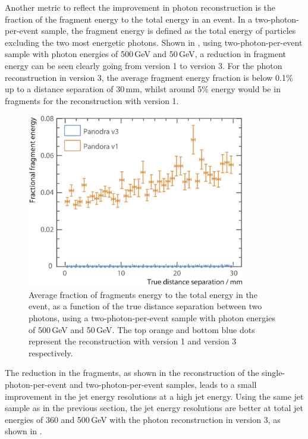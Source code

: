 Another metric to reflect the improvement in photon reconstruction is the fraction of the fragment energy to the total energy in an event. In a two-photon-per-event sample, the fragment energy is defined as the total energy of particles excluding the two most energetic photons. Shown in , using two-photon-per-event sample with photon energies of  500\,GeV and 50\,GeV, a reduction in fragment energy can be seen clearly going from \pandora version 1 to version 3. For the photon reconstruction in \pandora version 3, the average fragment energy fraction is below 0.1\% up to a distance separation of  30\,mm, whilst around 5\% energy would be in fragments for the reconstruction with \pandora version 1.
\begin{figure}[tbph]
\centering
\includegraphics[width=0.85\textwidth]{photon/DoubleCompareFragEnergy3}
\caption[Average fraction fragments energy to the total energy, as a function of the MC distance separation]
{Average fraction of fragments energy to the total energy  in the event, as a function of the true distance separation between two photons, using a two-photon-per-event sample with photon energies of  500\,GeV and 50\,GeV. The top orange and bottom blue dots represent the reconstruction with \pandora version 1 and version 3 respectively. }
\label{fig:photonDoubleFragEnergy}
\end{figure}



The reduction in the fragments, as shown in the reconstruction of the single-photon-per-event and two-photon-per-event samples, leads to a small improvement in the jet energy resolutions at a high jet energy. Using the same jet sample as in the previous section, the jet energy resolutions are better at total jet energies of 360 and 500\,GeV with the  photon reconstruction in \pandora version 3, as shown in .

